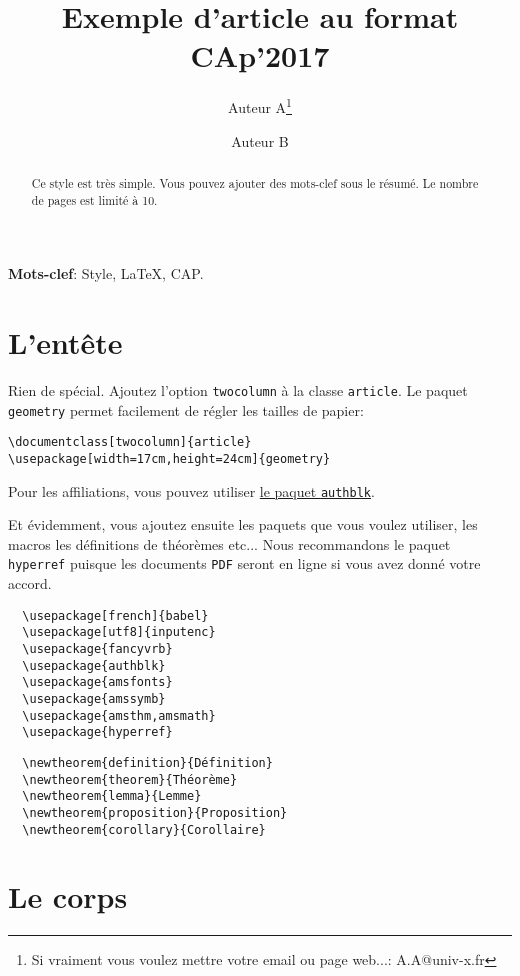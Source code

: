 \documentclass[twocolumn]{article}
\title{Exemple d'article au format CAp'2017}
\author[1]{Auteur A\thanks{Si vraiment vous voulez mettre votre email
    ou page web...: A.A@univ-x.fr}}
\author[2]{Auteur B}
\affil[1]{Université X, CNRS}
\affil[2]{Université Y, CNRS et INRIA}
\begin{document}
\maketitle

\begin{abstract}
  Ce style est très simple. Vous pouvez ajouter des mots-clef sous le
  résumé. Le nombre de pages est limité à 10. 
\end{abstract}

\medskip

\noindent\textbf{Mots-clef}: Style, \LaTeX, CAP.

\section{L'entête}
\label{sec:lentete}

Rien de spécial. Ajoutez l'option \texttt{twocolumn} à la classe
\texttt{article}. Le paquet \texttt{geometry} permet facilement de
régler les tailles de papier:

\begin{Verbatim}
\documentclass[twocolumn]{article}
\usepackage[width=17cm,height=24cm]{geometry}
\end{Verbatim}

Pour les affiliations, vous pouvez utiliser
\href{http://ctan.org/pkg/authblk}{le paquet \texttt{authblk}}.


Et évidemment, vous ajoutez ensuite les paquets que vous voulez
utiliser, les macros les définitions de théorèmes etc... Nous
recommandons le paquet \texttt{hyperref} puisque les documents
\texttt{PDF} seront en ligne si vous avez donné votre accord.

\begin{Verbatim}
  \usepackage[french]{babel}
  \usepackage[utf8]{inputenc}
  \usepackage{fancyvrb}
  \usepackage{authblk}
  \usepackage{amsfonts} 
  \usepackage{amssymb}
  \usepackage{amsthm,amsmath} 
  \usepackage{hyperref}
\end{Verbatim}

\begin{Verbatim}
  \newtheorem{definition}{Définition} 
  \newtheorem{theorem}{Théorème}
  \newtheorem{lemma}{Lemme} 
  \newtheorem{proposition}{Proposition}
  \newtheorem{corollary}{Corollaire}
\end{Verbatim}

\section{Le corps}
\label{sec:le-corps}
\end{document}
